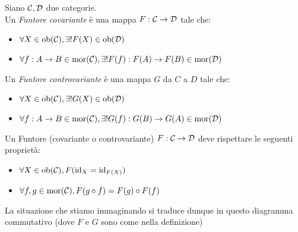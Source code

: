 \documentclass{article}
\begin{document}
\begin{definition}
    Siano $\mathcal{C}, \mathcal{D}$ due categorie.\\
    Un \emph{Funtore covariante} è una mappa $F: \mathcal{C}\to\mathcal{D}$ tale che:\begin{itemize}
        \item $\forall X \in \operatorname{ob}(\mathcal{C}), \exists! F(X)\in \operatorname{ob}(\mathcal{D})$
        \item $\forall f:A\to B \in \operatorname{mor}(\mathcal{C}), \exists! F(f):F(A)\to F(B) \in \operatorname{mor}(\mathcal{D})$
    \end{itemize}
    Un \emph{Funtore controvariante} è una mappa $G$ da $C$ a $D$ tale che:\begin{itemize}
        \item $\forall X \in \operatorname{ob}(\mathcal{C}), \exists! G(X)\in \operatorname{ob}(\mathcal{D})$
        \item $\forall f:A\to B \in \operatorname{mor}(\mathcal{C}), \exists! G(f):G(B)\to G(A) \in \operatorname{mor}(\mathcal{D})$
    \end{itemize}
    Un Funtore (covariante o controvariante) $F:\mathcal{C}\to \mathcal{D}$ deve rispettare le seguenti proprietà:\begin{itemize}
        \item $\forall X \in \operatorname{ob}(\mathcal{C}), F(\operatorname{id}_{X} = \operatorname{id}_{F(X)})$
        \item $\forall f,g \in \operatorname{mor}(\mathcal{C}),F(g\circ f) = F(g) \circ F(f)$
    \end{itemize}
\end{definition}

La situazione che stiamo immaginando si traduce dunque in questo diagramma commutativo (dove $F$ e $G$ sono come nella definizione)
\end{document}
